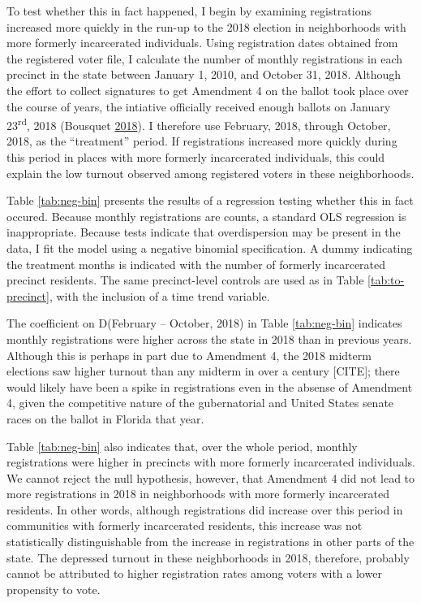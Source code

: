 \documentclass[
  12pt,
]{article}
\begin{document}
To test whether this in fact happened, I begin by examining registrations increased more quickly in the run-up to the 2018 election in neighborhoods with more formerly incarcerated individuals. Using registration dates obtained from the registered voter file, I calculate the number of monthly registrations in each precinct in the state between January 1, 2010, and October 31, 2018. Although the effort to collect signatures to get Amendment 4 on the ballot took place over the course of years, the intiative officially received enough ballots on January 23\textsuperscript{rd}, 2018 (Bousquet \protect\hyperlink{ref-Bousquet2018}{2018}). I therefore use February, 2018, through October, 2018, as the ``treatment'' period. If registrations increased more quickly during this period in places with more formerly incarcerated individuals, this could explain the low turnout observed among registered voters in these neighborhoods.

Table \ref{tab:neg-bin} presents the results of a regression testing whether this in fact occured. Because monthly registrations are counts, a standard OLS regression is inappropriate. Because tests indicate that overdispersion may be present in the data, I fit the model using a negative binomial specification. A dummy indicating the treatment months is indicated with the number of formerly incarcerated precinct residents. The same precinct-level controls are used as in Table \ref{tab:to-precinct}, with the inclusion of a time trend variable.

\begin{singlespace}


\end{singlespace}

The coefficient on D(February -- October, 2018) in Table \ref{tab:neg-bin} indicates monthly registrations were higher across the state in 2018 than in previous years. Although this is perhaps in part due to Amendment 4, the 2018 midterm elections saw higher turnout than any midterm in over a century {[}CITE{]}; there would likely have been a spike in registrations even in the absense of Amendment 4, given the competitive nature of the gubernatorial and United States senate races on the ballot in Florida that year.

Table \ref{tab:neg-bin} also indicates that, over the whole period, monthly registrations were higher in precincts with more formerly incarcerated individuals. We cannot reject the null hypothesis, however, that Amendment 4 did not lead to more registrations in 2018 in neighborhoods with more formerly incarcerated residents. In other words, although registrations did increase over this period in communities with formerly incarcerated residents, this increase was not statistically distinguishable from the increase in registrations in other parts of the state. The depressed turnout in these neighborhoods in 2018, therefore, probably cannot be attributed to higher registration rates among voters with a lower propensity to vote.
\end{document}
